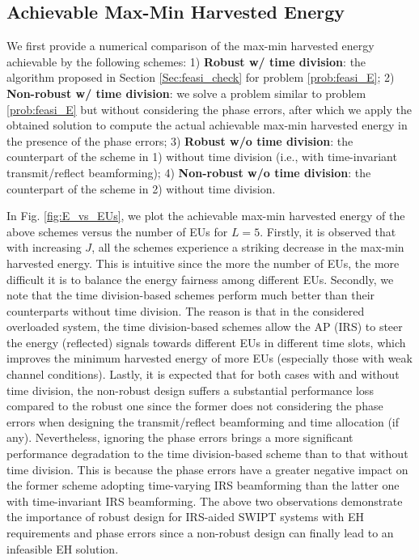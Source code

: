 \documentclass[12pt,draftclsnofoot, onecolumn]{IEEEtran}
\theoremstyle{plain}
\begin{document}
\begin{sloppypar}
\vspace{-1mm}
\subsection{Achievable Max-Min Harvested Energy}
We first provide a numerical comparison of the max-min harvested energy achievable by the following schemes: 1) \textbf{Robust w/ time division}: the algorithm proposed in Section \ref{Sec:feasi_check} for problem \eqref{prob:feasi_E}; 2) \textbf{Non-robust w/ time division}: we solve a problem similar to problem \eqref{prob:feasi_E} but without considering the phase errors, after which we apply the obtained solution to compute the actual achievable max-min harvested energy in the presence of the phase errors; 3) \textbf{Robust w/o time division}: the counterpart of the scheme in 1) without time division (i.e., with time-invariant transmit/reflect beamforming); 4) \textbf{Non-robust w/o time division}: the counterpart of the scheme in 2) without time division. 

In Fig. \ref{fig:E_vs_EUs}, we plot the achievable max-min harvested energy of the above schemes versus the number of EUs for $L = 5$. Firstly, it is observed that with increasing $J$, all the schemes experience a striking decrease in the max-min harvested energy. This is intuitive since the more the number of EUs, the more difficult it is to balance the energy fairness among different EUs. Secondly, we note that the time division-based schemes perform much better than their counterparts without time division. The reason is that in the considered overloaded system, the time division-based schemes allow the AP (IRS) to steer the energy (reflected) signals towards different EUs in different time slots, which improves the minimum harvested energy of more EUs (especially those with weak channel conditions). Lastly, it is expected that for both cases with and without time division, the non-robust design suffers a substantial performance loss compared to the robust one since the former does not considering the phase errors when designing the transmit/reflect beamforming and time allocation (if any). 
Nevertheless, ignoring the phase errors brings a more significant performance degradation to the time division-based scheme than to that without time division. This is because the phase errors have a greater negative impact on the former scheme adopting time-varying IRS beamforming than the latter one with time-invariant IRS beamforming. The above two observations demonstrate the importance of robust design for IRS-aided SWIPT systems with EH requirements and phase errors since a non-robust design can finally lead to an infeasible EH solution. %


\end{sloppypar}
\end{document}
